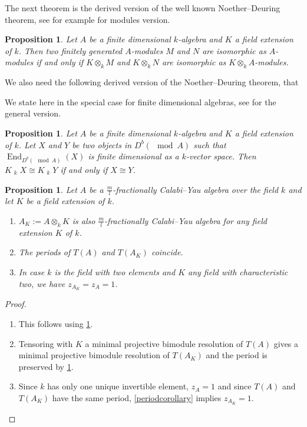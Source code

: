 \documentclass[a4paper,reqno,11pt]{amsart}
\newtheorem{proposition}[theorem]{Proposition}
\theoremstyle{definition}
\newcommand{\End}{\operatorname{End}\nolimits}
\newcommand{\Lotimes}{\mathop{\stackrel{\mathbf{L}}{\otimes}}\nolimits}
\newcommand{\new}[1]{{\blue #1}}
\newcommand{\old}[1]{{\red #1}}
\numberwithin{equation}{section}
\begin{document}
The next theorem is the \new{derived version of} the well known Noether--Deuring theorem, see for example \cite[19.25]{Lam} \new{for modules version.}

\old{
\begin{proposition} \label{noetherdeuring}
Let $A$ be a finite dimensional $k$-algebra and $K$ a field extension of $k$. 
Then two finitely generated $A$-modules $M$ and $N$ are isomorphic as $A$-modules if and only if $K \otimes_k M$ and $K \otimes_k N$ are isomorphic as $K \otimes_k A$-modules.
\end{proposition}

We also need the following derived version of the Noether--Deuring theorem, that} We state here in the special case for finite dimensional algebras, see \cite[Theorem 3.8.8]{Z} for the general version.
\begin{proposition} \label{noetherdeuringderived}
Let $A$ be a finite dimensional $k$-algebra and $K$ a field extension of $k$.
Let $X$ and $Y$ be two objects in $D^b(\mod A)$ such that $\End_{D^b(\mod A)}(X)$ is finite dimensional as a $k$-vector space. Then
$K \Lotimes_k X \cong K \Lotimes_k Y$ if and only if $X \cong Y$.
\end{proposition}

\begin{proposition} \label{characterstic2case}
Let $A$ be a $\frac{m}{l}$-fractionally Calabi--Yau algebra over the field $k$ and let $K$ be a field extension of $k$.
\begin{enumerate}
\item $A_K:=A \otimes_k K$ is also $\frac{m}{l}$-fractionally Calabi--Yau algebra for any field extension $K$ of $k$.
\item The periods of $T(A)$ and $T(A_K)$ coincide.
\item In case $k$ is the field with two elements and $K$ any field with characteristic two, we have $z_{A_K}=z_A=1$.
\end{enumerate}
\end{proposition}
\begin{proof}
\begin{enumerate}
\item This follows using \ref{noetherdeuringderived}.
\item Tensoring with $K$ a minimal projective bimodule resolution of $T(A)$ gives a minimal projective bimodule resolution of $T(A_K)$ and the period is preserved by \ref{noetherdeuring}.
\item Since $k$ has only one unique invertible element, $z_A=1$ and since $T(A)$ and $T(A_K)$ have the same period, \ref{periodcorollary} implies $z_{A_K}=1$.


\end{enumerate}

\end{proof}
\end{document}
